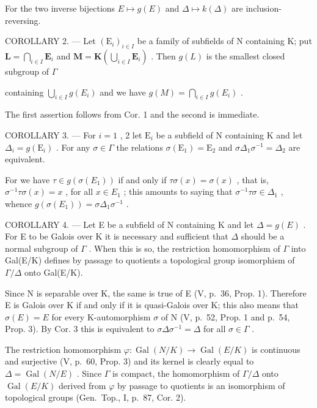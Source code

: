 For the two inverse bijections \(E \mapsto g(E)\) and \(\Delta \mapsto k(\Delta)\) are inclusion-reversing.

COROLLARY 2. --- Let \((\mathrm{E}_i)_{i\in I}\) be a family of subfields of N containing K; put \(\mathbf{L} = \bigcap_{i\in I}\mathbf{E}_i\) and \(\mathbf{M} = \mathbf{K}\left(\bigcup_{i\in I}\mathbf{E}_i\right)\) . Then \(g(L)\) is the smallest closed subgroup of \(\Gamma\)

containing \(\bigcup_{i\in I}g(E_i)\) and we have \(g(M) = \bigcap_{i\in I}g(E_i)\) .

The first assertion follows from Cor. 1 and the second is immediate.

COROLLARY 3. --- For \(i=1\) , 2 let \(\mathrm{E}_{i}\) be a subfield of N containing K and let \(\Delta_{i}=g(\mathrm{E}_{i})\) . For any \(\sigma\in\Gamma\) the relations \(\sigma(\mathrm{E}_{1})=\mathrm{E}_{2}\) and \(\sigma\Delta_{1}\sigma^{-1}=\Delta_{2}\) are equivalent.

For we have \(\tau \in g(\sigma(E_1))\) if and only if \(\tau\sigma(x) = \sigma(x)\) , that is, \(\sigma^{-1}\tau\sigma(x) = x\) , for all \(x \in E_1\) ; this amounts to saying that \(\sigma^{-1}\tau\sigma \in \Delta_1\) , whence \(g(\sigma(E_1)) = \sigma\Delta_1\sigma^{-1}\) .

COROLLARY 4. --- Let E be a subfield of N containing K and let \(\Delta = g(E)\) . For E to be Galois over K it is necessary and sufficient that \(\Delta\) should be a normal subgroup of \(\Gamma\) . When this is so, the restriction homomorphism of \(\Gamma\) into Gal(E/K) defines by passage to quotients a topological group isomorphism of \(\Gamma/\Delta\) onto Gal(E/K).

Since N is separable over K, the same is true of E (V, p.~36, Prop. 1). Therefore E is Galois over K if and only if it is quasi-Galois over K; this also means that \(\sigma(E) = E\) for every K-automorphism \(\sigma\) of N (V, p.~52, Prop. 1 and p.~54, Prop. 3). By Cor. 3 this is equivalent to \(\sigma\Delta\sigma^{-1} = \Delta\) for all \(\sigma \in \Gamma\) .

The restriction homomorphism \(\varphi: \operatorname{Gal}(N/K) \to \operatorname{Gal}(E/K)\) is continuous and surjective (V, p.~60, Prop. 3) and its kernel is clearly equal to \(\Delta = \operatorname{Gal}(N/E)\) . Since \(\Gamma\) is compact, the homomorphism of \(\Gamma/\Delta\) onto \(\operatorname{Gal}(E/K)\) derived from \(\varphi\) by passage to quotients is an isomorphism of topological groups (Gen.~Top., I, p.~87, Cor. 2).

